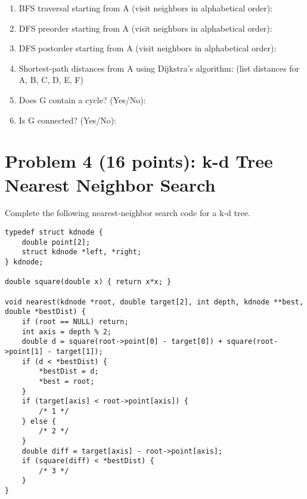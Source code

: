 \documentclass[12pt]{article}
\begin{document}
\begin{enumerate}[label=\alph*)]
\item BFS traversal starting from A (visit neighbors in alphabetical order): \underline{\hspace{2in}} \\
\item DFS preorder starting from A (visit neighbors in alphabetical order): \underline{\hspace{2in}} \\
\item DFS postorder starting from A (visit neighbors in alphabetical order): \underline{\hspace{2in}} \\
\item Shortest-path distances from A using Dijkstra's algorithm: \underline{\hspace{3in}} (list distances for A, B, C, D, E, F) \\
\item Does G contain a cycle? (Yes/No): \underline{\hspace{1in}} \\
\item Is G connected? (Yes/No): \underline{\hspace{1in}} \\
\end{enumerate}

\newpage

\section*{Problem 4 (16 points): k-d Tree Nearest Neighbor Search}
Complete the following nearest-neighbor search code for a k-d tree.

\begin{verbatim}
typedef struct kdnode {
    double point[2];
    struct kdnode *left, *right;
} kdnode;

double square(double x) { return x*x; }

void nearest(kdnode *root, double target[2], int depth, kdnode **best, double *bestDist) {
    if (root == NULL) return;
    int axis = depth % 2;
    double d = square(root->point[0] - target[0]) + square(root->point[1] - target[1]);
    if (d < *bestDist) {
        *bestDist = d;
        *best = root;
    }
    if (target[axis] < root->point[axis]) {
        /* 1 */
    } else {
        /* 2 */
    }
    double diff = target[axis] - root->point[axis];
    if (square(diff) < *bestDist) {
        /* 3 */
    }
}
\end{verbatim}
\end{document}
